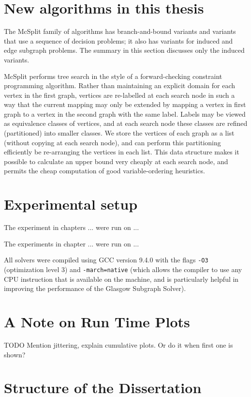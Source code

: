 \section{New algorithms in this thesis}

The McSplit family of algorithms has branch-and-bound variants and variants
that use a sequence of decision problems; it also has variants for induced and
edge subgraph problems. The summary in this section discusses only the induced
variants.

McSplit performs tree search in the style of a forward-checking constraint
programming algorithm. Rather than maintaining an explicit domain for each
vertex in the first graph, vertices are re-labelled at each search node in such
a way that the current mapping may only be extended by mapping a vertex in
first graph to a vertex in the second graph with the same label. Labels may be
viewed as equivalence classes of vertices, and at each search node these
classes are refined (partitioned) into smaller classes. We store the vertices
of each graph as a list (without copying at each search node), and can perform
this partitioning efficiently be re-arranging the vertices in each list. This
data structure makes it possible to calculate an upper bound very cheaply at
each search node, and permits the cheap computation of good variable-ordering
heuristics.

\section{Experimental setup}

The experiment in chapters ... were run on ...

The experiments in chapter ... were run on ...

All solvers were compiled using GCC version 9.4.0 with the flags
\texttt{-O3} (optimization level 3) and \texttt{-march=native}
(which allows the compiler to use any CPU instruction that is available
on the machine, and is particularly helpful in improving the performance
of the Glasgow Subgraph Solver).

\section{A Note on Run Time Plots}

TODO Mention jittering, explain cumulative plots. Or do it when first
one is shown?

\section{Structure of the Dissertation}

